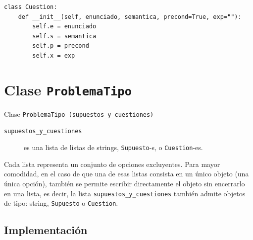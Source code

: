 \documentclass[10pt,a4paper]{report}
\begin{document}
\begin{verbatim}
class Cuestion:
    def __init__(self, enunciado, semantica, precond=True, exp=""):
        self.e = enunciado
        self.s = semantica
        self.p = precond
        self.x = exp
\end{verbatim}
\section{Clase \texttt{ProblemaTipo}}
\label{sec:org105b572}

Clase \texttt{ProblemaTipo (supuestos\_y\_cuestiones)}
\begin{description}
\item[{\texttt{supuestos\_y\_cuestiones}}] es una lista de listas de strings, \texttt{Supuesto}-s, o \texttt{Cuestion}-es.
\end{description}
Cada lista representa un conjunto de opciones excluyentes.
Para mayor comodidad, en el caso de que una de esas listas consista en un único objeto (una única opción), también se permite escribir directamente el objeto sin encerrarlo en una lista, es decir, la lista \texttt{supuestos\_y\_cuestiones} también admite objetos de tipo: string, \texttt{Supuesto} o \texttt{Cuestion}.
\subsection{Implementación}
\label{sec:orgf711272}
\end{document}
